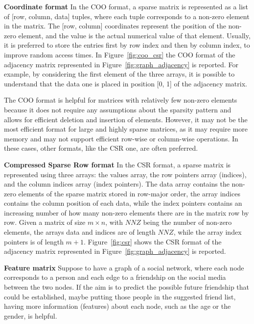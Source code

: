 \textbf{Coordinate format} \newline
In the COO format, a sparse matrix is represented as a list of [row, column, data] tuples, where each tuple corresponds to a non-zero element in the matrix.
The [row, column] coordinates represent the position of the non-zero element, and the value is the actual numerical value of that element.
Usually, it is preferred to store the entries first by row index and then by column index, to improve random access times.
In Figure~\ref{fig:coo_csr} the COO format of the adjacency matrix represented in Figure~\ref{fig:graph_adjacency} is reported.
For example, by considering the first element of the three arrays, it is possible to understand that the data one is placed in position [0, 1] of the adjacency matrix.

The COO format is helpful for matrices with relatively few non-zero elements because it does not require any assumptions about the sparsity pattern and allows for efficient deletion and insertion of elements.
However, it may not be the most efficient format for large and highly sparse matrices, as it may require more memory and may not support efficient row-wise or column-wise operations.
In these cases, other formats, like the CSR one, are often preferred.

\textbf{Compressed Sparse Row format} \newline
In the CSR format, a sparse matrix is represented using three arrays: the values array, the row pointers array (indices), and the column indices array (index pointers).
The data array contains the non-zero elements of the sparse matrix stored in row-major order, the array indices contains the column position of each data, while the index pointers
contains an increasing number of how many non-zero elements there are in the matrix row by row.
Given a matrix of size $m \times n$, with $NNZ$ being the number of non-zero elements, the arrays data and indices are of length $NNZ$, while the array index pointers is of length $m+1$.
Figure~\ref{fig:csr} shows the CSR format of the adjacency matrix represented in Figure~\ref{fig:graph_adjacency} is reported.

\textbf{Feature matrix} \newline
Suppose to have a graph of a social network, where each node corresponds to a person and each edge to a friendship on the social media between the two nodes.
If the aim is to predict the possible future friendship that could be established, maybe putting those people in the suggested friend list, having more information (features) about each node, such as the age or the gender, is helpful.

